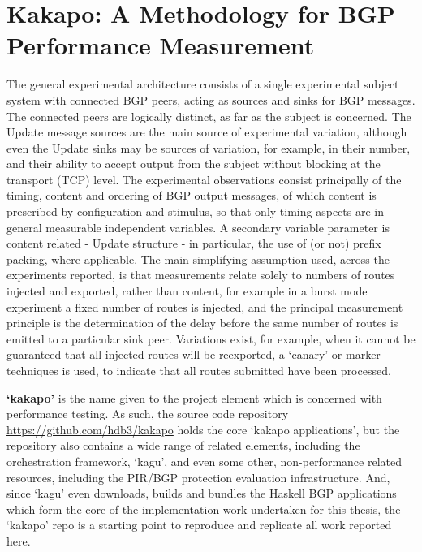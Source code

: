 \section{Kakapo: A Methodology for BGP Performance Measurement}
The general experimental architecture consists of a single experimental subject system with connected BGP peers, acting as sources and sinks for BGP messages.
The connected peers are logically distinct, as far as the subject is concerned.
The Update message sources are the main source of experimental variation, although even the Update sinks may be sources of variation, for example, in their number, and their ability to accept output from the subject without blocking at the transport (TCP) level.
The experimental observations consist principally of the timing, content and ordering of BGP output messages, of which content is prescribed by configuration and stimulus, so that only timing aspects are in general measurable independent variables.
A secondary variable parameter is content related - Update structure - in particular, the use of (or not) prefix packing, where applicable.
The main simplifying assumption used, across the experiments reported, is that measurements relate solely to numbers of routes injected and exported, rather than content, for example in a burst mode experiment a fixed number of routes is injected, and the principal measurement principle is the determination of the delay before the same number of routes is emitted to a particular sink peer.
Variations exist, for example, when it cannot be guaranteed that all injected routes will be reexported, a `canary' or marker techniques is used, to indicate that all routes submitted have been processed.


\textbf{`kakapo'} is the name given to the project element which is concerned with performance testing.
As such, the source code repository \url{https://github.com/hdb3/kakapo} holds the core `kakapo applications', but the repository also contains a wide range of related elements, including the orchestration framework, `kagu', and even some other, non-performance related resources, including the PIR/BGP protection evaluation infrastructure.
And, since `kagu' even downloads, builds and bundles the Haskell BGP applications which form the core of the implementation work undertaken for this thesis, the `kakapo' repo is a starting point to reproduce and replicate all work reported here.

